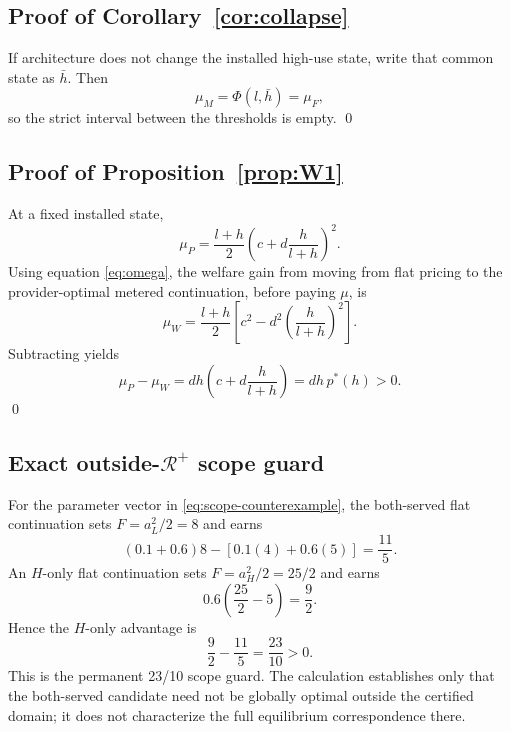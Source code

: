 \subsection{Proof of Corollary~\ref{cor:collapse}}

If architecture does not change the installed high-use state, write that common state as $\bar h$. Then
\[
\mu_M=\Phi(l,\bar h)=\mu_F,
\]
so the strict interval between the thresholds is empty. \qed

\subsection{Proof of Proposition~\ref{prop:W1}}

At a fixed installed state,
\[
\mu_P=\frac{l+h}{2}\left(c+d\frac{h}{l+h}\right)^2.
\]
Using equation \eqref{eq:omega}, the welfare gain from moving from flat pricing to the provider-optimal metered continuation, before paying $\mu$, is
\[
\mu_W=\frac{l+h}{2}\left[c^2-d^2\left(\frac{h}{l+h}\right)^2\right].
\]
Subtracting yields
\[
\mu_P-\mu_W
=dh\left(c+d\frac{h}{l+h}\right)
=dh\,p^*(h)>0.
\]
\qed

\subsection{Exact outside-$\mathcal R^+$ scope guard}

For the parameter vector in \eqref{eq:scope-counterexample}, the both-served flat continuation sets $F=a_L^2/2=8$ and earns
\[
(0.1+0.6)8-[0.1(4)+0.6(5)]=\frac{11}{5}.
\]
An $H$-only flat continuation sets $F=a_H^2/2=25/2$ and earns
\[
0.6\left(\frac{25}{2}-5\right)=\frac{9}{2}.
\]
Hence the $H$-only advantage is
\[
\frac{9}{2}-\frac{11}{5}=\frac{23}{10}>0.
\]
This is the permanent 23/10 scope guard. The calculation establishes only that the both-served candidate need not be globally optimal outside the certified domain; it does not characterize the full equilibrium correspondence there.
